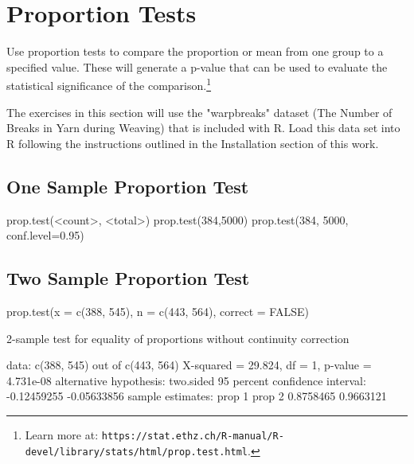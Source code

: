 \section{Proportion Tests}
Use proportion tests to compare the proportion or mean from one group to a specified value. These will generate a p-value that can be used to evaluate the statistical significance of the comparison.\footnote{Learn more at: \texttt{https://stat.ethz.ch/R-manual/R-devel/library/stats/html/prop.test.html}.}

The exercises in this section will use the "warpbreaks" dataset (The Number of Breaks in Yarn during Weaving) that is included with R. Load this data set into R following the instructions outlined in the Installation section of this work.

\subsection{One Sample Proportion Test}
prop.test(<count>, <total>)
prop.test(384,5000)
prop.test(384, 5000, conf.level=0.95)

\subsection{Two Sample Proportion Test}
prop.test(x = c(388, 545), n = c(443, 564), correct = FALSE)

2-sample test for equality of proportions without continuity
        correction

data:  c(388, 545) out of c(443, 564)
X-squared = 29.824, df = 1, p-value = 4.731e-08
alternative hypothesis: two.sided
95 percent confidence interval:
 -0.12459255 -0.05633856
sample estimates:
   prop 1    prop 2 
0.8758465 0.9663121 